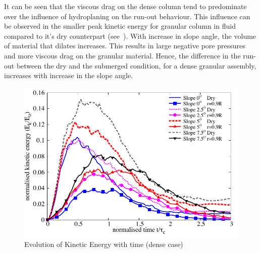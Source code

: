 It can be seen that the viscous drag on the dense column tend to predominate over the influence of hydroplaning on the run-out behaviour. This influence can be observed in the smaller peak kinetic energy for granular column in fluid compared to it's dry counterpart (see~). With increase in slope angle, the volume of material that dilates increases. This results in large negative pore pressures and more viscous drag on the granular material. Hence, the difference in the run-out between the dry and the submerged condition, for a dense granular assembly, increases with increase in the slope angle.

\begin{figure}
\centering
\includegraphics[width=0.97\columnwidth]{KE_dense_slope}
\caption{Evolution of Kinetic Energy with time (dense case)}
\label{fig:KE_dense}
\end{figure}


